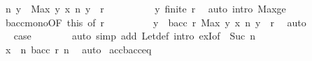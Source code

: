 \begin{isabellebody}
\ {\isachardoublequoteopen}n\ y\ {\isacharless}{\kern0pt}{\isacharequal}{\kern0pt}\ Max\ {\isacharparenleft}{\kern0pt}{\isacharparenleft}{\kern0pt}{\isasymlambda}{\isacharparenleft}{\kern0pt}y{\isacharcomma}{\kern0pt}\ x{\isacharparenright}{\kern0pt}{\isachardot}{\kern0pt}\ n\ y{\isacharparenright}{\kern0pt}\ {\isacharbackquote}{\kern0pt}\ r{\isacharparenright}{\kern0pt}{\isachardoublequoteclose}\isanewline
\ \ \ \ \ \ \ \ \isamarkupfalse%
\ y\ {\isacartoucheopen}finite\ r{\isacartoucheclose}\ \isamarkupfalse%
\ {\isacharparenleft}{\kern0pt}auto\ intro{\isacharbang}{\kern0pt}{\isacharcolon}{\kern0pt}\ Max{\isacharunderscore}{\kern0pt}ge{\isacharparenright}{\kern0pt}\isanewline
\ \ \ \ \ \ \isamarkupfalse%
\ bacc{\isacharunderscore}{\kern0pt}mono{\isacharbrackleft}{\kern0pt}OF\ this{\isacharcomma}{\kern0pt}\ of\ r{\isacharbrackright}{\kern0pt}\isanewline
\ \ \ \ \ \ \isamarkupfalse%
\ \isamarkupfalse%
\ {\isachardoublequoteopen}y\ {\isasymin}\ bacc\ r\ {\isacharparenleft}{\kern0pt}Max\ {\isacharparenleft}{\kern0pt}{\isacharparenleft}{\kern0pt}{\isasymlambda}{\isacharparenleft}{\kern0pt}y{\isacharcomma}{\kern0pt}\ x{\isacharparenright}{\kern0pt}{\isachardot}{\kern0pt}\ n\ y{\isacharparenright}{\kern0pt}\ {\isacharbackquote}{\kern0pt}\ r{\isacharparenright}{\kern0pt}{\isacharparenright}{\kern0pt}{\isachardoublequoteclose}\ \isamarkupfalse%
\ auto\isanewline
\ \ \ \ \isamarkupfalse%
\isanewline
\ \ \ \ \isamarkupfalse%
\ \isamarkupfalse%
\ {\isacharquery}{\kern0pt}case\isanewline
\ \ \ \ \ \ \isamarkupfalse%
\ {\isacharparenleft}{\kern0pt}auto\ simp\ add{\isacharcolon}{\kern0pt}\ Let{\isacharunderscore}{\kern0pt}def\ intro{\isacharbang}{\kern0pt}{\isacharcolon}{\kern0pt}\ exI{\isacharbrackleft}{\kern0pt}of\ {\isacharunderscore}{\kern0pt}\ {\isachardoublequoteopen}Suc\ n{\isachardoublequoteclose}{\isacharbrackright}{\kern0pt}{\isacharparenright}{\kern0pt}\isanewline
\ \ \isamarkupfalse%
\isanewline
\ \ \isamarkupfalse%
\ \isamarkupfalse%
\ {\isachardoublequoteopen}x\ {\isasymin}\ {\isacharparenleft}{\kern0pt}{\isasymUnion}n{\isachardot}{\kern0pt}\ bacc\ r\ n{\isacharparenright}{\kern0pt}{\isachardoublequoteclose}\ \isamarkupfalse%
\ auto\isanewline
{}\isamarkupfalse%
%
\endisatagproof
{\isafoldproof}%
%
\isadelimproof
\isanewline
%
\endisadelimproof
\isanewline
{}\isamarkupfalse%
\ acc{\isacharunderscore}{\kern0pt}bacc{\isacharunderscore}{\kern0pt}eq{\isacharcolon}{\kern0pt}\isanewline

\end{isabellebody}
